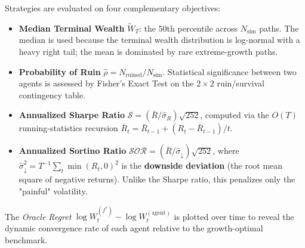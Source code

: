 Strategies are evaluated on four complementary objectives:

\begin{itemize}
    \item \textbf{Median Terminal Wealth} $\tilde W_T$: the 50th percentile
    across $N_{\text{sim}}$ paths.  The median is used because the terminal
    wealth distribution is log-normal with a heavy right tail; the mean is
    dominated by rare extreme-growth paths.

    \item \textbf{Probability of Ruin}
    $\hat\rho = N_{\text{ruined}}/N_{\text{sim}}$.
    Statistical significance between two agents is assessed by Fisher's
    Exact Test on the $2\times 2$ ruin/survival contingency table.

    \item \textbf{Annualized Sharpe Ratio}
    $\mathcal{S} = (\bar R/\hat\sigma_R)\sqrt{252}$,
    computed via the $O(T)$ running-statistics recursion
    $\bar R_t = \bar R_{t-1} + (R_t - \bar R_{t-1})/t$.

    \item \textbf{Annualized Sortino Ratio}
    $\mathcal{SOR} = (\bar R/\hat\sigma_\downarrow)\sqrt{252}$,
    where $\hat\sigma_\downarrow^2 = T^{-1}\sum_t\min(R_t,0)^2$ is the
    \textbf{downside deviation} (the root mean square of negative returns).
    Unlike the Sharpe ratio, this penalizes only the "painful" volatility.
\end{itemize}

The \emph{Oracle Regret} $\log W_t^{(f^*)} - \log W_t^{(\text{agent})}$ is
plotted over time to reveal the dynamic convergence rate of each agent
relative to the growth-optimal benchmark.
